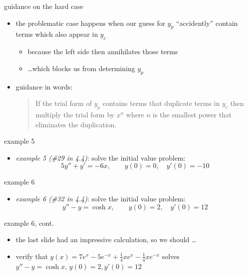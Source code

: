 \documentclass[dvipsnames]{beamer}
\begin{document}
\begin{frame}{guidance on the hard case}

\begin{itemize}
\item the problematic case happens when our guess for $y_p$ ``accidently'' contain terms which also appear in $y_c$
    \begin{itemize}
    \item because the left side then annihilates those terms
    \item \dots which blocks us from determining $y_p$
    \end{itemize}

\bigskip
\item guidance in words:

\begin{quotation}
\noindent \alert{If the trial form of $y_p$ contains terms that duplicate terms in $y_c$ then multiply the trial form by $x^n$ where $n$ is the smallest power that eliminates the duplication.}
\end{quotation}
\end{itemize}
\end{frame}


\begin{frame}{example 5}

\begin{itemize}
\item \emph{example 5 (\#29 in 4.4)}: solve the initial value problem:
    $$5 y'' + y' = -6 x, \qquad y(0) = 0, \quad y'(0)=-10$$
\end{itemize}

\vspace{60mm}
\end{frame}


\begin{frame}{example 6}

\begin{itemize}
\item \emph{example 6 (\#32 in 4.4)}: solve the initial value problem:
    $$y'' - y = \cosh x, \qquad y(0) = 2, \quad y'(0)=12$$
\end{itemize}

\vspace{60mm}
\end{frame}


\begin{frame}{example 6, cont.}

\begin{itemize}
\item the last slide had an impressive calculation, so we should \dots
\item verify that $y(x)=7 e^x - 5 e^{-x} + \frac{1}{4} x e^x - \frac{1}{4} x e^{-x}$ solves\, $y'' - y = \cosh x,\, y(0) = 2, y'(0)=12$
\end{itemize}

\vspace{55mm}
\end{frame}
\end{document}

